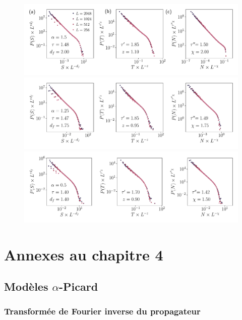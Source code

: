 \begin{figure}[h]
\centering
\includegraphics[width=\textwidth]{Chapitre3/Figures/Avalanches/Rescale_Av_alpha15.pdf}
\includegraphics[width=\textwidth]{Chapitre3/Figures/Avalanches/Rescale_Av_alpha125.pdf}
\includegraphics[width=\textwidth]{Chapitre3/Figures/Avalanches/Rescale_Av_alpha05.pdf}
\caption{}
\label{fig:annexeAvTBLRR2}
\end{figure}

\FloatBarrier

\section{Annexes au chapitre 4}



\subsection{Modèles $\alpha$-Picard}

\subsubsection{Transformée de Fourier inverse du propagateur}

